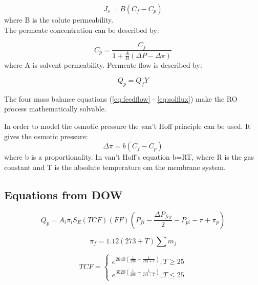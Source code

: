 \begin{equation}
\label{eq:solflux}
J_{s}=B(C_{f}- C_{p})
\end{equation}
 where B is the solute permeability.
\\The permeate concentration can be described by:

\begin{equation}
\label{eq:permcond}
C_{p}=\frac{C_{f}}{1+\frac{A}{B}(\Delta P - \Delta\pi)}
\end{equation}
where A is solvent permeability.
Permeate flow is described by:

\begin{equation}
\label{eq:permflow}
Q_{p}=Q_{f}Y
\end{equation}

The four mass balance equations (\ref{eq:feedflow} - \ref{eq:solflux}) make the RO process mathematically solvable.

In order to model the osmotic pressure the van't Hoff principle can be used. It gives the osmotic pressure:
\begin{equation}
\label{eq:posm}
\Delta\pi=b(C_{f}-C_{p})
\end{equation}
where b is a proportionality. In van't Hoff's equation b=RT, where R is the gas constant and T is the absolute temperature om the membrane system. 

\subsection{Equations from DOW}
\mathleft
\begin{equation}
\label{eq:pQ}
Q_{p}=A_{i}\pi_{i} S_{E}(TCF)(FF)(P_{fi}-\frac{\Delta P_{fcj}}{2}-P_{pi}-\pi+\pi_{p})
\end{equation}



\begin{equation}
\label{eq:feedOsmP}
\pi_{f}= 1.12(273+T) \sum m_{j}
\end{equation}

\begin{equation}
\label{eq:TCF}
TCF =
\begin{cases}
e^{2640(\frac{1}{298}- \frac{1}{273+T})} , T\geq25 \\
e^{3020(\frac{1}{298}- \frac{1}{273+T})} , T\leq25
\end{cases}
\end{equation}

